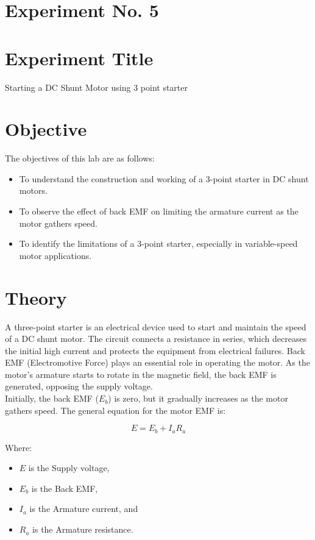 \documentclass[a4paper,12pt]{article}
\begin{document}
	\section{Experiment No. 5}
	
	\section{Experiment Title }
	Starting a DC Shunt Motor using 3 point starter
	\section{Objective}
	
	The objectives of this lab are as follows:
	\begin{itemize}
	\item To understand the construction and working of a 3-point starter in DC shunt motors.
	\item To observe the effect of back EMF on limiting the armature current as the motor gathers speed.
	\item To identify the limitations of a 3-point starter, especially in variable-speed motor applications.
	\end{itemize}
	
	\section{Theory}
	
	A three-point starter is an electrical device used to start and maintain the speed of a DC shunt motor. The circuit connects a resistance in series, which decreases the initial high current and protects the equipment from electrical failures. Back EMF (Electromotive Force) plays an essential role in operating the motor. As the motor's armature starts to rotate in the magnetic field, the back EMF is generated, opposing the supply voltage.\\
	
 
	Initially, the back EMF (\(E_b\)) is zero, but it gradually increases as the motor gathers speed. The general equation for the motor EMF is:
	
	\[
	E = E_b + I_aR_a
	\]
	
	Where:
	\begin{itemize}
		\item \(E\) is the Supply voltage,
		\item \(E_b\) is the Back EMF,
		\item \(I_a\) is the Armature current, and
		\item \(R_a\) is the Armature resistance.
	\end{itemize}
	
\end{document}
